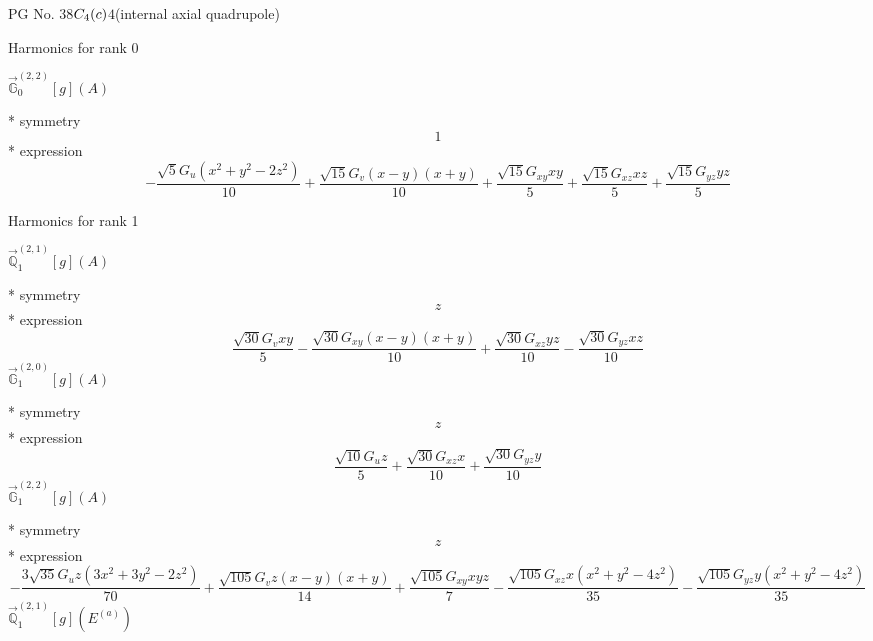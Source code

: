 \documentclass[fleqn,8pt]{jsarticle}
\begin{document}
\setcounter{MaxMatrixCols}{32}

\renewcommand{\tablename}{Table~}
\renewcommand{\figurename}{Figure~}
\begin{center}
\LARGE
PG No. 38\quad$C_{\rm 4}(c)$\quad$4$\quad[ tetragonal ] (internal axial quadrupole)
\end{center}

\noindent * Harmonics for rank 0

\noindent\quad $\vec{\mathbb{G}}_{0}^{(2,2)}[g](A)$

\noindent\quad ** symmetry
\begin{dmath*}
1
\end{dmath*}
\noindent\quad ** expression
\begin{dmath*}
- \frac{\sqrt{5} G_{u} \left(x^{2} + y^{2} - 2 z^{2}\right)}{10} + \frac{\sqrt{15} G_{v} \left(x - y\right) \left(x + y\right)}{10} + \frac{\sqrt{15} G_{xy} x y}{5} + \frac{\sqrt{15} G_{xz} x z}{5} + \frac{\sqrt{15} G_{yz} y z}{5}
\end{dmath*}

\noindent * Harmonics for rank 1

\noindent\quad $\vec{\mathbb{Q}}_{1}^{(2,1)}[g](A)$

\noindent\quad ** symmetry
\begin{dmath*}
z
\end{dmath*}
\noindent\quad ** expression
\begin{dmath*}
\frac{\sqrt{30} G_{v} x y}{5} - \frac{\sqrt{30} G_{xy} \left(x - y\right) \left(x + y\right)}{10} + \frac{\sqrt{30} G_{xz} y z}{10} - \frac{\sqrt{30} G_{yz} x z}{10}
\end{dmath*}
\noindent\quad $\vec{\mathbb{G}}_{1}^{(2,0)}[g](A)$

\noindent\quad ** symmetry
\begin{dmath*}
z
\end{dmath*}
\noindent\quad ** expression
\begin{dmath*}
\frac{\sqrt{10} G_{u} z}{5} + \frac{\sqrt{30} G_{xz} x}{10} + \frac{\sqrt{30} G_{yz} y}{10}
\end{dmath*}
\noindent\quad $\vec{\mathbb{G}}_{1}^{(2,2)}[g](A)$

\noindent\quad ** symmetry
\begin{dmath*}
z
\end{dmath*}
\noindent\quad ** expression
\begin{dmath*}
- \frac{3 \sqrt{35} G_{u} z \left(3 x^{2} + 3 y^{2} - 2 z^{2}\right)}{70} + \frac{\sqrt{105} G_{v} z \left(x - y\right) \left(x + y\right)}{14} + \frac{\sqrt{105} G_{xy} x y z}{7} - \frac{\sqrt{105} G_{xz} x \left(x^{2} + y^{2} - 4 z^{2}\right)}{35} - \frac{\sqrt{105} G_{yz} y \left(x^{2} + y^{2} - 4 z^{2}\right)}{35}
\end{dmath*}
\noindent\quad $\vec{\mathbb{Q}}_{1}^{(2,1)}[g](E^{(a)})$
\end{document}
